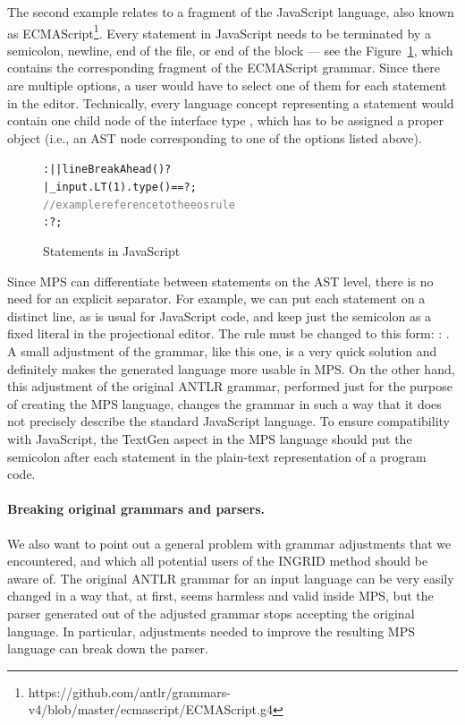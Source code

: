 The second example relates to a fragment of the JavaScript language, also known as ECMAScript\footnote{https://github.com/antlr/grammars-v4/blob/master/ecmascript/ECMAScript.g4}.
Every statement in JavaScript needs to be terminated by a semicolon, newline, end of the file, or end of the block --- see the Figure~\ref{fig:JAVASCRIPTSTMT}, which contains the corresponding fragment of the ECMAScript grammar.
Since there are multiple options, a user would have to select one of them for each statement in the editor.
Technically, every language concept representing a statement would contain one child node of the interface type , which has to be assigned a proper object (i.e., an AST node corresponding to one of the options listed above).

\begin{figure}[ht]
\begin{framed}
\begin{alltt}
\small
{} :  |  | {lineBreakAhead()}? 
    | {{\_}input.LT(1).type() == }? ;
\textcolor{gray}{// example reference to the eos rule}
 :  ?  ;
\end{alltt}
\end{framed}
\caption{Statements in JavaScript}
\label{fig:JAVASCRIPTSTMT}
\end{figure}

Since MPS can differentiate between statements on the AST level, there is no need for an explicit separator.
For example, we can put each statement on a distinct line, as is usual for JavaScript code, and keep just the semicolon as a fixed literal in the projectional editor.
The  rule must be changed to this form:  : \antlrliteral{;}.
A small adjustment of the grammar, like this one, is a very quick solution and definitely makes the generated language more usable in MPS.
On the other hand, this adjustment of the original ANTLR grammar, performed just for the purpose of creating the MPS language, changes the grammar in such a way that it does not precisely describe the standard JavaScript language.
To ensure compatibility with JavaScript, the TextGen aspect in the MPS language should put the semicolon after each statement in the plain-text representation of a program code.

\paragraph{Breaking original grammars and parsers.}
We also want to point out a general problem with grammar adjustments that we encountered, and which all potential users of the INGRID method should be aware of.
The original ANTLR grammar for an input language can be very easily changed in a way that, at first, seems harmless and valid inside MPS, but the parser generated out of the adjusted grammar stops accepting the original language.
In particular, adjustments needed to improve the resulting MPS language can break down the parser.

